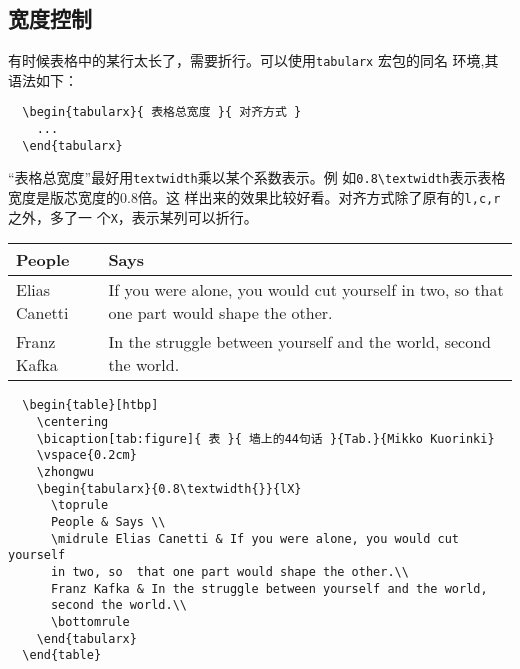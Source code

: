\subsection{宽度控制}

有时候表格中的某行太长了，需要折行。可以使用\texttt{tabularx} 宏包的同名
环境,其语法如下：

\begin{lstlisting}
  \begin{tabularx}{ 表格总宽度 }{ 对齐方式 }
    ...
  \end{tabularx}
\end{lstlisting}

“表格总宽度”最好用\texttt{textwidth}乘以某个系数表示。例
如\texttt{0.8\textbackslash{textwidth}}表示表格宽度是版芯宽度的0.8倍。这
样出来的效果比较好看。对齐方式除了原有的\texttt{l,c,r}之外，多了一
个\texttt{X}，表示某列可以折行。

\begin{table}[htbp]
  \centering
  \vspace{0.2cm}
  \zhongwu
  \begin{tabularx}{0.8\textwidth{}}{lX}
    \toprule
    People & Says \\
    \midrule
    Elias Canetti & If you were alone, you would cut yourself in two, so
    that one part would shape the other.\\
    Franz Kafka & In the struggle between yourself and the world,
    second the world.\\
    \bottomrule
  \end{tabularx}
\end{table}

\begin{lstlisting}
  \begin{table}[htbp]
    \centering
    \bicaption[tab:figure]{ 表 }{ 墙上的44句话 }{Tab.}{Mikko Kuorinki}
    \vspace{0.2cm}
    \zhongwu
    \begin{tabularx}{0.8\textwidth{}}{lX}
      \toprule
      People & Says \\
      \midrule Elias Canetti & If you were alone, you would cut yourself
      in two, so  that one part would shape the other.\\
      Franz Kafka & In the struggle between yourself and the world,
      second the world.\\
      \bottomrule
    \end{tabularx}
  \end{table}
\end{lstlisting}



